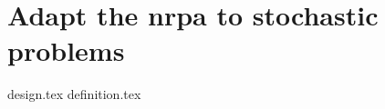\section{Adapt the \acrshort{nrpa} to stochastic problems}%
\label{sec:snrpa}

{design.tex}
{definition.tex}


